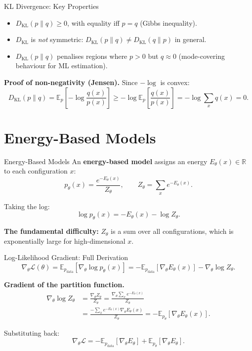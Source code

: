 \documentclass[aspectratio=169]{beamer}
\newcommand{\E}{\mathbb{E}}
\newcommand{\pdata}{p_{\mathrm{data}}}
\newcommand{\pmodel}{p_{\theta}}
\newcommand{\DKL}{D_{\mathrm{KL}}}
\newcommand{\Zth}{Z_\theta}
\begin{document}
\begin{frame}{KL Divergence: Key Properties}
\begin{itemize}
  \item $\DKL(p\|q)\ge 0$, with equality iff $p=q$ (Gibbs inequality).
  \item $\DKL$ is \emph{not} symmetric: $\DKL(p\|q)\ne\DKL(q\|p)$ in general.
  \item $\DKL(p\|q)$ penalises regions where $p>0$ but $q\approx 0$
        (mode-covering behaviour for ML estimation).
\end{itemize}

\medskip
\textbf{Proof of non-negativity (Jensen).}
Since $-\log$ is convex:
\[
  \DKL(p\|q)
  = \E_p\!\left[-\log\frac{q(x)}{p(x)}\right]
  \ge -\log\E_p\!\left[\frac{q(x)}{p(x)}\right]
  = -\log\sum_x q(x) = 0.
\]
\end{frame}

\section{Energy-Based Models}

\begin{frame}{Energy-Based Models}
An \textbf{energy-based model} assigns an energy $E_\theta(x)\in\mathbb{R}$ to
each configuration $x$:
\[
  \pmodel(x)
  = \frac{e^{-E_\theta(x)}}{\Zth},
  \qquad
  \Zth = \sum_x e^{-E_\theta(x)}.
\]

Taking the log:
\[
  \log\pmodel(x) = -E_\theta(x) - \log\Zth.
\]

\textbf{The fundamental difficulty:} $\Zth$ is a sum over all configurations,
which is exponentially large for high-dimensional $x$.
\end{frame}

\begin{frame}{Log-Likelihood Gradient: Full Derivation}
\[
  \nabla_\theta\mathcal{L}(\theta)
  = \E_{\pdata}[\nabla_\theta\log\pmodel(x)]
  = -\E_{\pdata}[\nabla_\theta E_\theta(x)]
    - \nabla_\theta\log\Zth.
\]

\textbf{Gradient of the partition function.}
\begin{align*}
  \nabla_\theta\log\Zth
  &= \frac{\nabla_\theta\Zth}{\Zth}
   = \frac{\nabla_\theta\sum_x e^{-E_\theta(x)}}{\Zth} \\
  &= \frac{-\sum_x e^{-E_\theta(x)}\nabla_\theta E_\theta(x)}{\Zth}
   = -\E_{\pmodel}[\nabla_\theta E_\theta(x)].
\end{align*}

Substituting back:
\[
  \boxed{
    \nabla_\theta\mathcal{L}
    = -\E_{\pdata}[\nabla_\theta E_\theta]
      + \E_{\pmodel}[\nabla_\theta E_\theta].
  }
\]
\end{frame}
\end{document}
